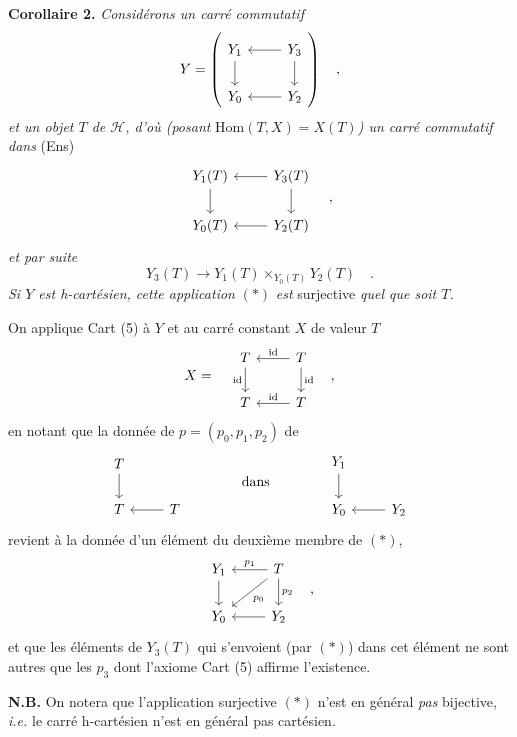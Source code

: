 \textbf{Corollaire 2.} \textit{Considérons un carré commutatif}
\[
Y = \left(\begin{tikzcd}
Y_1 \ar[d] & Y_3 \ar[l] \ar[d] \\
Y_0 & Y_2 \ar[l]
\end{tikzcd}\right) \quad ,
\]
\textit{et un objet $T$ de $\mathcal{H}$, d'où (posant} $\mathrm{Hom}(T,X) = X(T)$\textit{) un carré commutatif dans} (Ens)
\[
\begin{tikzcd}
Y_1(T) \ar[d] & Y_3(T) \ar[l] \ar[d] \\
Y_0(T) & Y_2(T) \ar[l]
\end{tikzcd} \quad ,
\]
\textit{et par suite}
\[
Y_3(T) \longrightarrow Y_1(T) \times_{Y_0(T)} Y_2(T) \quad . \tag*{$(*)$}
\]
\textit{Si $Y$ est h-cartésien, cette application} $(*)$ \textit{est} surjective \textit{quel que soit $T$.}

On applique Cart (5) à $Y$ et au carré constant $X$ de valeur $T$
\[
X = \quad
\begin{tikzcd}
T \ar[d, "\mathrm{id}"'] & T \ar[l, "\mathrm{id}"'] \ar[d, "\mathrm{id}"] \\
T & T \ar[l, "\mathrm{id}"']
\end{tikzcd} \quad ,
\]
en notant que la donnée de $p = (p_0, p_1, p_2)$ de
\[
\begin{tikzcd}
T \ar[d] & \\
T & T \ar[l]
\end{tikzcd}
\qquad\qquad \text{dans} \qquad\qquad
\begin{tikzcd}
Y_1 \ar[d] & \\
Y_0 & Y_2 \ar[l]
\end{tikzcd}
\]
revient à la donnée d'un élément du deuxième membre de $(*)$,
\[
\begin{tikzcd}
Y_1 \ar[d] & T \ar[l, "p_1"'] \ar[dl, "p_0"] \ar[d, "p_2"] \\
Y_0 & Y_2 \ar[l]
\end{tikzcd} \quad ,
\]
et que les éléments de $Y_3(T)$ qui s'envoient (par $(*)$) dans cet élément ne sont autres que les $p_3$ dont l'axiome Cart (5) affirme l'existence.

\textbf{N.B.} On notera que l'application surjective $(*)$ n'est en général \textit{pas} bijective, \textit{i.e.} le carré h-cartésien n'est en général pas cartésien.

